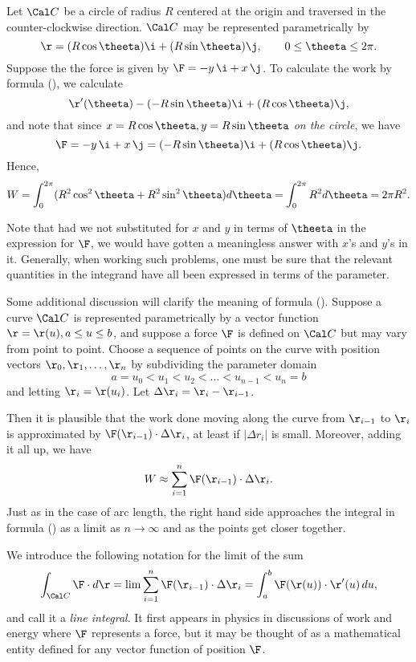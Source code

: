 \nextex
\xdef\CircEx{\en}
Let $\Cal C$ be a circle of radius $R$ centered at the origin and
traversed in the counter-clockwise direction.  $\Cal C$
may be represented parametrically by
$$
\r = (R\cos\theeta)\i + (R\sin\theeta)\j,\qquad 0\le \theeta \le 2\pi.
$$
Suppose the the force
is given by $\F = -y\,\i + x\,\j$.   To calculate the work
by formula (\LineInt), we calculate
$$
     \r'(\theeta) - (-R\sin\theeta)\i + (R\cos\theeta)\j,
$$
and note that since $x = R\cos\theeta, y = R\sin\theeta$ {\it on the
circle\/}, we have
$$
   \F = -y\,\i + x\,\j = (-R\sin\theeta)\i + (R\cos\theeta)\j.
$$
Hence,
$$
W = \int_0^{2\pi} (R^2\cos^2\theeta + R^2\sin^2\theeta)d\theeta =
           \int_0^{2\pi} R^2 d\theeta = 2\pi R^2.
$$

Note that had we not substituted for $x$ and $y$ in terms of $\theeta$
in the expression for $\F$, we would have gotten a meaningless
answer with $x$'s and $y$'s in it.   Generally, when working
such problems, one must be sure that  the relevant quantities in the integrand
have all been expressed in terms of the parameter.
\endexample

Some additional discussion will clarify the meaning of formula
(\LineInt).   Suppose a curve $\Cal C$ is represented
parametrically by a vector function
$\r = \r(u), a\le u \le b$, and suppose a  force $\F$
is defined on $\Cal C$ but may vary from point to point.  Choose
a sequence of points on the curve with position vectors
$\r_0, \r_1, \dots, \r_n$ by subdividing the parameter domain
$$
    a = u_0 < u_1 < u_2 < \dots < u_{n-1} < u_n = b
$$
and letting $\r_i = \r(u_i)$.  Let $\Delta \r_i = \r_i - \r_{i-1}$.
\medskip
\centerline{}
\medskip
Then it is plausible that the work done moving along the curve
from $\r_{i-1}$ to $\r_i$
 is approximated by $\F(\r_{i-1})\cdot\Delta\r_i$,
at least if $|\Delta r_i|$ is small.  Moreover, adding it all up,
we have
$$
      W \approx \sum_{i=1}^n \F(\r_{i-1})\cdot\Delta \r_i.
$$
Just as in the case of arc length, the right hand side approaches
the integral in formula (\LineInt) as a limit as $n \to \infty$
and as the points get closer together.

We introduce the following notation for the limit of the sum
\nexteqn
\def\LineIntII{\eqn}
$$
\int_{\Cal C} \F\cdot d\r = \lim \sum_{i=1}^n \F(\r_{i-1})\cdot\Delta \r_i
            = \int_a^b\F(\r(u))\cdot\r'(u)\,du,
$$
and call it  a {\it line integral}.  It first appears in
physics in discussions of work and energy where $\F$ represents a
force, but it may be thought of as a mathematical entity
defined for any vector function of position $\F$.  

